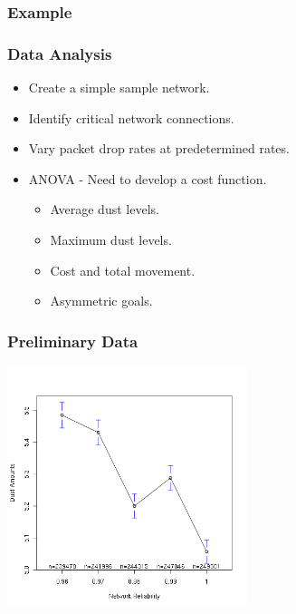 \documentclass{beamer}
\begin{document}
%    
%  
%
%
%


\begin{frame}
  \frametitle{Example}
  
\end{frame}



\begin{frame}
  \frametitle{Data Analysis}

  \begin{itemize}
  \item Create a simple sample network.
  \item Identify critical network connections.
  \item Vary packet drop rates at predetermined rates.
  \item ANOVA - Need to develop a cost function.
    \begin{itemize}
    \item Average dust levels.
    \item Maximum dust levels.
    \item Cost and total movement.
    \item Asymmetric goals.
    \end{itemize}
  \end{itemize}

\end{frame}

\begin{frame}
  \frametitle{Preliminary Data}

  \includegraphics[height=7cm]{dustLevelsMeans}

\end{frame}
\end{document}
